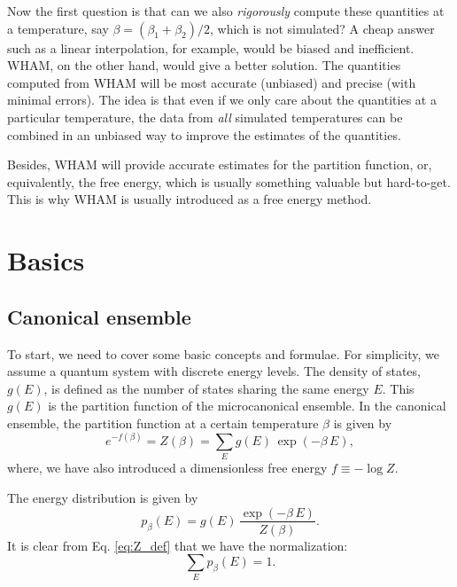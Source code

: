 \documentclass[aip,jcp,preprint,superscriptaddress]{revtex4-1}
\begin{document}
Now the first question is that
can we also \emph{rigorously} compute these quantities at a temperature,
say $\beta = (\beta_1 + \beta_2)/2$, which is not simulated?
%
A cheap answer such as a linear interpolation, for example,
would be biased and inefficient.
%
WHAM, on the other hand,
would give a better solution.
%
The quantities computed from WHAM will be
most accurate (unbiased)
and precise (with minimal errors).
%
The idea is that even if we only care about the quantities
at a particular temperature,
the data from \emph{all} simulated temperatures
can be combined in an unbiased way
to improve the estimates of the quantities.



Besides, WHAM will provide accurate
estimates for the partition function,
or, equivalently, the free energy,
which is usually something valuable
but hard-to-get.
%
This is why WHAM is usually introduced
as a free energy method.




\section{Basics}



\subsection{Canonical ensemble}



To start, we need to cover some basic concepts and formulae.
%
For simplicity,
we assume a quantum system with discrete energy levels.
%
The density of states, $g(E)$, is defined as the number of states
sharing the same energy $E$.
%
This $g(E)$
is the partition function of
the microcanonical ensemble.
%
In the canonical ensemble,
the partition function
at a certain temperature $\beta$
is given by
%
\begin{equation}
  e^{-f(\beta)} = Z(\beta) = \sum_E g(E) \, \exp(-\beta \, E),
  \label{eq:Z_def}
\end{equation}
%
where,
we have also introduced
a dimensionless free energy $f\equiv -\log Z$.



The energy distribution is given by
%
\begin{equation}
  p_\beta(E) = g(E) \, \frac{ \exp(-\beta \, E) } { Z(\beta) }.
  \label{eq:pE_def}
\end{equation}
%
It is clear from Eq. \eqref{eq:Z_def}
that we have the normalization:
\begin{equation}
  \sum_E p_\beta(E) = 1.
  \label{eq:pE_normalization}
\end{equation}
%
\end{document}
